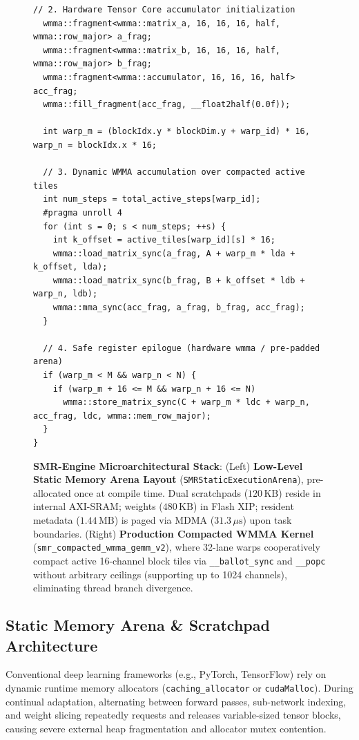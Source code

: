 \documentclass{article}
\begin{document}
\begin{figure}[!t]
\begin{minipage}[t]{0.48\textwidth}
\begin{lstlisting}[style=cudaStyle]
  // 2. Hardware Tensor Core accumulator initialization
  wmma::fragment<wmma::matrix_a, 16, 16, 16, half, wmma::row_major> a_frag;
  wmma::fragment<wmma::matrix_b, 16, 16, 16, half, wmma::row_major> b_frag;
  wmma::fragment<wmma::accumulator, 16, 16, 16, half> acc_frag;
  wmma::fill_fragment(acc_frag, __float2half(0.0f));

  int warp_m = (blockIdx.y * blockDim.y + warp_id) * 16, warp_n = blockIdx.x * 16;

  // 3. Dynamic WMMA accumulation over compacted active tiles
  int num_steps = total_active_steps[warp_id];
  #pragma unroll 4
  for (int s = 0; s < num_steps; ++s) {
    int k_offset = active_tiles[warp_id][s] * 16;
    wmma::load_matrix_sync(a_frag, A + warp_m * lda + k_offset, lda);
    wmma::load_matrix_sync(b_frag, B + k_offset * ldb + warp_n, ldb);
    wmma::mma_sync(acc_frag, a_frag, b_frag, acc_frag);
  }

  // 4. Safe register epilogue (hardware wmma / pre-padded arena)
  if (warp_m < M && warp_n < N) {
    if (warp_m + 16 <= M && warp_n + 16 <= N)
      wmma::store_matrix_sync(C + warp_m * ldc + warp_n, acc_frag, ldc, wmma::mem_row_major);
  }
}
\end{lstlisting}
\end{minipage}
\vskip -2pt
\caption{\textbf{SMR-Engine Microarchitectural Stack}: (Left) \textbf{Low-Level Static Memory Arena Layout} (\texttt{SMRStaticExecutionArena}), pre-allocated once at compile time. Dual scratchpads ($120\,\text{KB}$) reside in internal AXI-SRAM; weights ($480\,\text{KB}$) in Flash XIP; resident metadata ($1.44\,\text{MB}$) is paged via MDMA ($31.3\,\mu\text{s}$) upon task boundaries. (Right) \textbf{Production Compacted WMMA Kernel} (\texttt{smr\_compacted\_wmma\_gemm\_v2}), where 32-lane warps cooperatively compact active 16-channel block tiles via \texttt{\_\_ballot\_sync} and \texttt{\_\_popc} without arbitrary ceilings (supporting up to 1024 channels), eliminating thread branch divergence.}
\label{fig:arena_layout}
\label{fig:warp_dispatcher}
\end{figure}

\subsection{Static Memory Arena \& Scratchpad Architecture}
Conventional deep learning frameworks (e.g., PyTorch, TensorFlow) rely on dynamic runtime memory allocators (\texttt{caching\_allocator} or \texttt{cudaMalloc}). During continual adaptation, alternating between forward passes, sub-network indexing, and weight slicing repeatedly requests and releases variable-sized tensor blocks, causing severe external heap fragmentation and allocator mutex contention.
\end{document}
